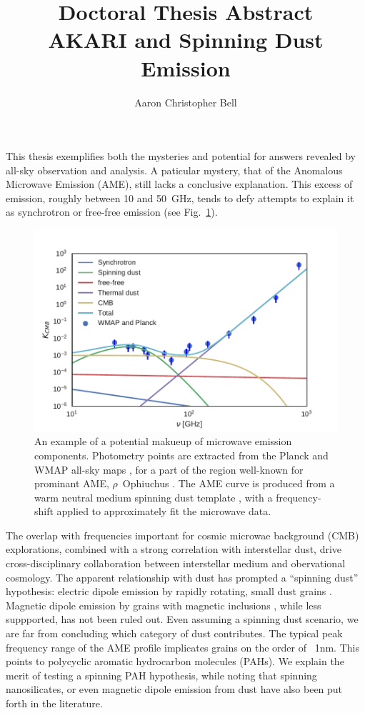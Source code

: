 \documentclass[12pt,a4paper]{article}
\title{Doctoral Thesis Abstract\\
AKARI and Spinning Dust Emission\\
}
\author{Aaron Christopher Bell}
\begin{document}
\maketitle

This thesis exemplifies both the mysteries and potential for answers revealed by all-sky observation and analysis. A paticular mystery, that of the Anomalous Microwave Emission (AME), still lacks a conclusive explanation.  This excess of emission, roughly between 10 and 50~GHz, tends to defy attempts to explain it as synchrotron or free-free emission (see Fig.~\ref{fig:mw_foregrounds_demo_rOph}).
      \begin{figure}[h]
        \centering
        \includegraphics[width=\textwidth/2]{../Plots/ch_intro/mw_foregrounds_demo_rOph.pdf}
          \caption{\small An example of a potential makueup of microwave emission components. Photometry points are extracted from the Planck and WMAP all-sky maps \citep{hfi14viii}, for a part of the region well-known for prominant AME, $\rho$~Ophiuchus \citep{planckxx11}. The AME curve is produced from a warm neutral medium spinning dust template \citep{ali-haimoud09}, with a frequency-shift applied to approximately fit the microwave data.}
        \label{fig:mw_foregrounds_demo_rOph}
      \end{figure}
The overlap with frequencies important for cosmic microwae background (CMB) explorations, combined with a strong correlation with interstellar dust, drive cross-disciplinary collaboration between interstellar medium and obervational cosmology. The apparent relationship with dust has prompted a ``spinning dust'' hypothesis:  electric dipole emission by rapidly rotating, small dust grains \citep{erickson57,draine98a}. Magnetic dipole emission by grains with magnetic inclusions \citep{draine99}, while less suppported, has not been ruled out. Even assuming a spinning dust scenario, we are far from concluding which category of dust contributes. The typical peak frequency range of the AME profile implicates grains on the order of ~1nm. This points to polycyclic aromatic hydrocarbon molecules (PAHs). We explain the merit of testing a spinning PAH hypothesis, while noting that spinning nanosilicates, or even magnetic dipole emission from dust have also been put forth in the literature.
\end{document}
